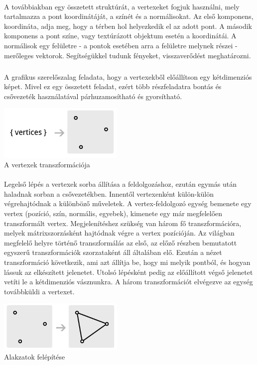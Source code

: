 \documentclass[12pt]{report}
\begin{document}
\paragraph{}
A továbbiakban egy összetett struktúrát, a vertexeket fogjuk használni, mely tartalmazza a pont koordinátáját, a színét és a normálisokat. Az első komponens, koordináta, adja meg, hogy a térben hol helyezkedik el az adott pont. A második komponens a pont színe, vagy textúrázott objektum esetén a koordinátái. A normálisok egy felületre - a pontok esetében arra a felületre melynek részei - merőleges vektorok. Segítségükkel tudunk fényeket, visszaverődést meghatározni.
\paragraph{}
A grafikus szerelőszalag\textsuperscript{\cite{pipeline}} feladata, hogy a vertexekből előállítson egy kétdimenziós képet. Mivel ez egy összetett feladat, ezért több részfeladatra bontás és csővezeték használatával párhuzamosítható és gyorsítható.
\begin{center}
\includegraphics[width=6cm]{pics/vertex_transformation}\\
{\footnotesize A vertexek transzformációja}
\end{center}
\paragraph{}
Legelső lépés a vertexek sorba állítása a feldolgozáshoz, ezután egymás után haladnak sorban a csővezetékben. Innentől vertexenként külön-külön végrehajtódnak a különböző műveletek. A vertex-feldolgozó egység bemenete egy vertex (pozíció, szín, normális, egyebek), kimenete egy már megfelelően transzformált vertex. Megjelenítéshez szükség van három fő transzformációra, melyek mátrixszorzásként hajtódnak végre a vertex pozícióján. Az világban megfelelő helyre történő transzformálás az első, az előző részben bemutatott egyszerű transzformációk szorzataként áll általában elő. Ezután a nézet transzformáció következik, ami azt állítja be, hogy mi melyik pontból, és hogyan lássuk az elkészített jelenetet. Utolsó lépésként pedig az előállított végső jelenetet vetíti le a kétdimenziós vásznunkra. A három transzformációt elvégezve az egység továbbküldi a vertexet.
\begin{center}
\includegraphics[width=6cm]{pics/shape_assembly}\\
{\footnotesize Alakzatok felépítése}
\end{center}
\end{document}
